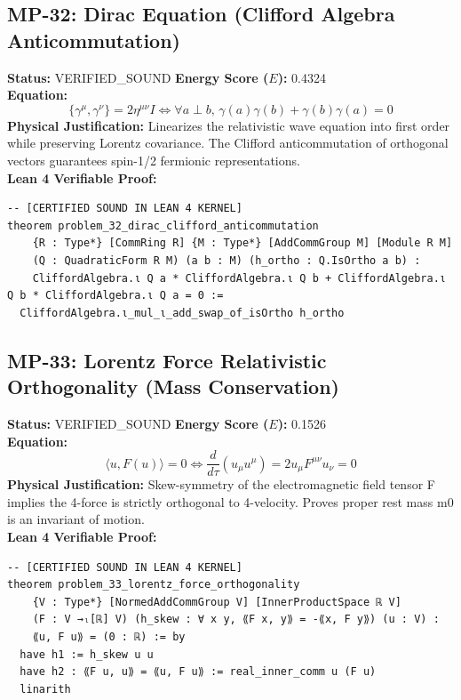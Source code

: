 \documentclass[11pt, a4paper]{article}
\begin{document}
\subsection{MP-32: Dirac Equation (Clifford Algebra Anticommutation)}
\textbf{Status:} VERIFIED\_SOUND \hfill \textbf{Energy Score ($E$):} 0.4324\\
\textbf{Equation:}
\begin{equation*}
\{\gamma^\mu, \gamma^\nu\} = 2 \eta^{\mu\nu} I \iff \forall a \perp b, \, \gamma(a)\gamma(b) + \gamma(b)\gamma(a) = 0
\end{equation*}
\textbf{Physical Justification:} Linearizes the relativistic wave equation into first order while preserving Lorentz covariance. The Clifford anticommutation of orthogonal vectors guarantees spin-1/2 fermionic representations.\\
\textbf{Lean 4 Verifiable Proof:}
\begin{verbatim}
-- [CERTIFIED SOUND IN LEAN 4 KERNEL]
theorem problem_32_dirac_clifford_anticommutation
    {R : Type*} [CommRing R] {M : Type*} [AddCommGroup M] [Module R M]
    (Q : QuadraticForm R M) (a b : M) (h_ortho : Q.IsOrtho a b) :
    CliffordAlgebra.ι Q a * CliffordAlgebra.ι Q b + CliffordAlgebra.ι Q b * CliffordAlgebra.ι Q a = 0 :=
  CliffordAlgebra.ι_mul_ι_add_swap_of_isOrtho h_ortho

\end{verbatim}

\subsection{MP-33: Lorentz Force Relativistic Orthogonality (Mass Conservation)}
\textbf{Status:} VERIFIED\_SOUND \hfill \textbf{Energy Score ($E$):} 0.1526\\
\textbf{Equation:}
\begin{equation*}
\langle u, F(u) \rangle = 0 \iff \frac{d}{d\tau}(u_\mu u^\mu) = 2 u_\mu F^{\mu\nu} u_\nu = 0
\end{equation*}
\textbf{Physical Justification:} Skew-symmetry of the electromagnetic field tensor F implies the 4-force is strictly orthogonal to 4-velocity. Proves proper rest mass m0 is an invariant of motion.\\
\textbf{Lean 4 Verifiable Proof:}
\begin{verbatim}
-- [CERTIFIED SOUND IN LEAN 4 KERNEL]
theorem problem_33_lorentz_force_orthogonality
    {V : Type*} [NormedAddCommGroup V] [InnerProductSpace ℝ V]
    (F : V →ₗ[ℝ] V) (h_skew : ∀ x y, ⟪F x, y⟫ = -⟪x, F y⟫) (u : V) :
    ⟪u, F u⟫ = (0 : ℝ) := by
  have h1 := h_skew u u
  have h2 : ⟪F u, u⟫ = ⟪u, F u⟫ := real_inner_comm u (F u)
  linarith

\end{verbatim}
\end{document}

